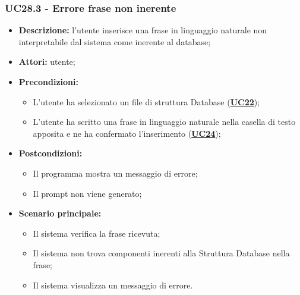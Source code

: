 \subsubsection{UC28.3 - Errore frase non inerente}
\label{sec:UC28.3}
\begin{itemize}
	\item \textbf{Descrizione:} l’utente inserisce una frase in linguaggio naturale non interpretabile dal sistema come inerente al database;
	\item \textbf{Attori:} utente;
	\item \textbf{Precondizioni:} 
	\begin{itemize}
		\item L’utente ha selezionato un file di struttura Database (\hyperref[sec:UC25]{\textbf{UC22}});
		\item L’utente ha scritto una frase in linguaggio naturale nella casella di testo apposita e ne ha confermato l’inserimento (\hyperref[sec:UC27]{\textbf{UC24}});
	\end{itemize}
	\item \textbf{Postcondizioni:} 
	\begin{itemize}
		\item Il programma mostra un messaggio di errore;
		\item Il prompt non viene generato;
	\end{itemize}
	\item \textbf{Scenario principale:} 
	\begin{itemize}
		\item Il sistema verifica la frase ricevuta;
		\item Il sistema non trova componenti inerenti alla Struttura Database nella frase;
		\item Il sistema visualizza un messaggio di errore.
	\end{itemize}
\end{itemize}

